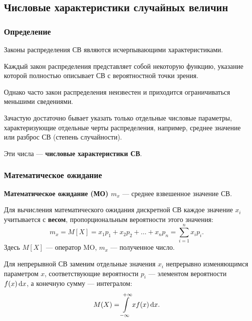 \documentclass[a4paper]{article}
\newcommand{\key}[1]{{\color{Medium}\bfseries #1}}
\begin{document}
        \subsection{Числовые характеристики случайных величин}

            \subsubsection{Определение}

                Законы распределения СВ являются исчерпывающими характеристиками.
                
                Каждый закон распределения представляет собой некоторую функцию, указание которой полностью описывает СВ с вероятностной точки зрения.
                
                Однако часто закон распределения неизвестен и приходится ограничиваться меньшими сведениями.
                
                Зачастую достаточно бывает указать только отдельные числовые параметры, характеризующие отдельные черты распределения, например, среднее значение или разброс СВ (степень случайности).
                
                Эти числа --- \key{числовые характеристики СВ}.

            \subsubsection{Математическое ожидание}

                \key{Математическое ожидание (МО) \boldmath$m_x$} --- среднее взвешенное значение СВ.
                
                Для вычисления математического ожидания дискретной СВ каждое значение $x_i$ учитывается с \key{весом}, пропорциональным вероятности этого значения:
                \begin{equation*}
                    m_x = M[X] = x_1 p_1 + x_2 p_2 + \ldots + x_n p_n =
                        \sum\limits_{i = 1}^{n} x_i p_i .
                \end{equation*}
                Здесь $M[X]$ --- оператор MO, $m_x$ --- полученное число.
                
                Для непрерывной СВ заменим отдельные значения $x_i$ непрерывно изменяющимся параметром $x$, соответствующие вероятности $p_i$ --- элементом вероятности $f(x) \dif x$, а конечную сумму --- интегралом:
                \begin{equation*}
                    M(X) = \int\limits_{-\infty}^{+\infty} x f(x) \dif x .
                \end{equation*}
\end{document}
